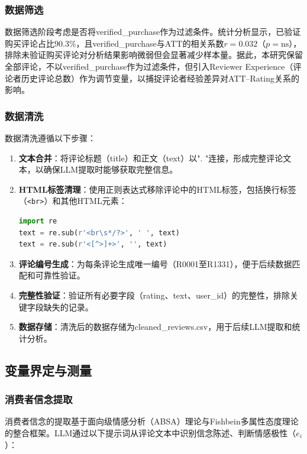 \subsubsection{数据筛选}

数据筛选阶段考虑是否将verified\_purchase作为过滤条件。统计分析显示，已验证购买评论占比90.3\%，且verified\_purchase与ATT的相关系数$r=0.032$（$p=\text{ns}$），排除未验证购买评论对分析结果影响微弱但会显著减少样本量。据此，本研究保留全部评论，不以verified\_purchase作为过滤条件，但引入Reviewer Experience（评论者历史评论总数）作为调节变量，以捕捉评论者经验差异对ATT--Rating关系的影响\cite{mitchell2022}。

\subsubsection{数据清洗}

数据清洗遵循以下步骤：

\begin{enumerate}
  \item \textbf{文本合并}：将评论标题（title）和正文（text）以". "连接，形成完整评论文本，以确保LLM提取时能够获取完整信息。
  \item \textbf{HTML标签清理}：使用正则表达式移除评论中的HTML标签，包括换行标签（\verb|<br>|）和其他HTML元素：
\begin{lstlisting}[language=Python, basicstyle=\small\ttfamily]
import re
text = re.sub(r'<br\s*/?>', ' ', text)
text = re.sub(r'<[^>]+>', '', text)
\end{lstlisting}
  \item \textbf{评论编号生成}：为每条评论生成唯一编号（R0001至R1331），便于后续数据匹配和可靠性验证。
  \item \textbf{完整性验证}：验证所有必要字段（rating、text、user\_id）的完整性，排除关键字段缺失的记录。
  \item \textbf{数据存储}：清洗后的数据存储为cleaned\_reviews.csv，用于后续LLM提取和统计分析。
\end{enumerate}

\subsection{变量界定与测量}

\subsubsection{消费者信念提取}

消费者信念的提取基于面向级情感分析（ABSA）理论与Fishbein多属性态度理论的整合框架。LLM通过以下提示词从评论文本中识别信念陈述、判断情感极性（$e_i$）：

